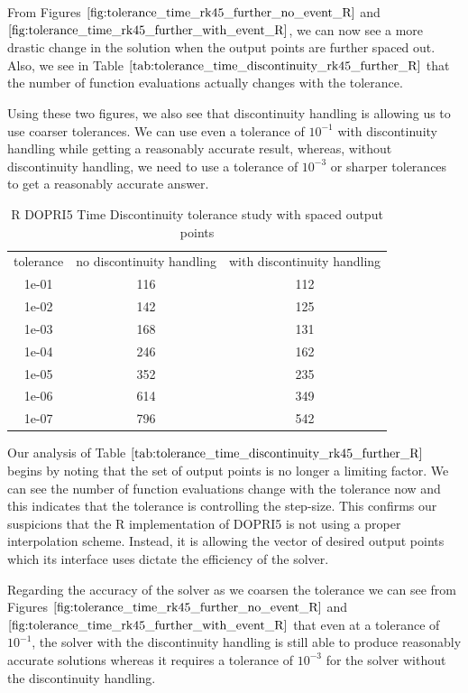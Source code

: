 From Figures $\ref{fig:tolerance_time_rk45_further_no_event_R}$ and $\ref{fig:tolerance_time_rk45_further_with_event_R}$, we can now see a more drastic change in the solution when the output points are further spaced out. Also, we see in Table $\ref{tab:tolerance_time_discontinuity_rk45_further_R}$ that the number of function evaluations actually changes with the tolerance.

Using these two figures, we also see that discontinuity handling is allowing us to use coarser tolerances. We can use even a tolerance of $10^{-1}$ with discontinuity handling while getting a reasonably accurate result, whereas, without discontinuity handling, we need to use a tolerance of $10^{-3}$ or sharper tolerances to get a reasonably accurate answer.

\begin{table}[H]
\caption {R DOPRI5 Time Discontinuity tolerance study with spaced output points} \label{tab:tolerance_time_discontinuity_rk45_further_R} 
\begin{center}
\begin{tabular}{ c c c }
tolerance & no discontinuity handling & with discontinuity handling \\ 
1e-01 & 116 & 112 \\
1e-02 & 142 & 125 \\
1e-03 & 168 & 131 \\
1e-04 & 246 & 162 \\
1e-05 & 352 & 235 \\
1e-06 & 614 & 349 \\
1e-07 & 796 & 542 \\
\end{tabular}
\end{center}
\end{table}

Our analysis of Table $\ref{tab:tolerance_time_discontinuity_rk45_further_R}$ begins by noting that the set of output points is no longer a limiting factor. We can see the number of function evaluations change with the tolerance now and this indicates that the tolerance is controlling the step-size. This confirms our suspicions that the R implementation of DOPRI5 is not using a proper interpolation scheme. Instead, it is allowing the vector of desired output points which its interface uses dictate the efficiency of the solver.

Regarding the accuracy of the solver as we coarsen the tolerance we can see from Figures $\ref{fig:tolerance_time_rk45_further_no_event_R}$ and $\ref{fig:tolerance_time_rk45_further_with_event_R}$ that even at a tolerance of $10^{-1}$, the solver with the discontinuity handling is still able to produce reasonably accurate solutions whereas it requires a tolerance of $10^{-3}$ for the solver without the discontinuity handling.

